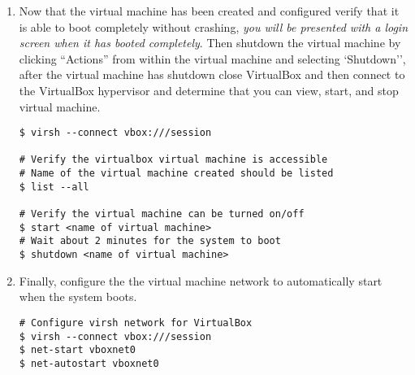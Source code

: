 \begin{enumerate}
\item	Now that the virtual machine has been created and configured verify that it is able to boot completely without crashing,
		\emph{you will be presented with a login screen when it has booted completely}. Then shutdown the virtual machine by clicking 
		``Actions'' from within the virtual machine and selecting `Shutdown'', after the virtual machine has shutdown close
		VirtualBox and then connect to the VirtualBox hypervisor and determine that you can view, start, and stop virtual machine.

\lstset{language=bash,caption=Verify VirtualBox Works with Virsh}
\begin{lstlisting}
$ virsh --connect vbox:///session

# Verify the virtualbox virtual machine is accessible
# Name of the virtual machine created should be listed
$ list --all

# Verify the virtual machine can be turned on/off
$ start <name of virtual machine>
# Wait about 2 minutes for the system to boot
$ shutdown <name of virtual machine>
\end{lstlisting}

\item	Finally, configure the the virtual machine network to automatically start when the system boots.

\lstset{language=bash,caption=Configure Network}
\begin{lstlisting}
# Configure virsh network for VirtualBox
$ virsh --connect vbox:///session
$ net-start vboxnet0
$ net-autostart vboxnet0
\end{lstlisting}				
\end{enumerate}




\newpage
